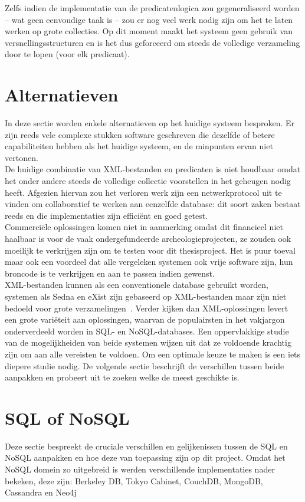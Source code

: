 Zelfs indien de implementatie van de predicatenlogica zou gegeneraliseerd worden -- wat geen eenvoudige taak is -- zou er nog veel werk nodig zijn om het te laten werken op grote collecties. Op dit moment maakt het systeem geen gebruik van versnellingsstructuren en is het dus geforceerd om steeds de volledige verzameling door te lopen (voor elk predicaat).

\section{Alternatieven}
In deze sectie worden enkele alternatieven op het huidige systeem besproken. Er zijn reeds vele complexe stukken software geschreven die dezelfde of betere capabiliteiten hebben als het huidige systeem, en de minpunten ervan niet vertonen.\\

De huidige combinatie van XML-bestanden en predicaten is niet houdbaar omdat het onder andere steeds de volledige collectie voorstellen in het geheugen nodig heeft. Afgezien hiervan zou het verloren werk zijn een netwerkprotocol uit te vinden om collaboratief te werken aan eenzelfde database: dit soort zaken bestaat reeds en die implementaties zijn effici\"ent en goed getest.\\

Commerci\"ele oplossingen komen niet in aanmerking omdat dit financieel niet haalbaar is voor de vaak ondergefundeerde archeologieprojecten, ze zouden ook moeilijk te verkrijgen zijn om te testen voor dit thesisproject. Het is puur toeval maar ook een voordeel dat alle vergeleken systemen ook vrije software zijn, hun broncode is te verkrijgen en aan te passen indien gewenst.\\ 

XML-bestanden kunnen als een conventionele database gebruikt worden, systemen als Sedna en eXist zijn gebaseerd op XML-bestanden maar zijn niet bedoeld voor grote verzamelingen~\cite{Green08}. Verder kijken dan XML-oplossingen levert een grote vari\"eteit aan oplossingen, waarvan de populairsten in het vakjargon onderverdeeld worden in SQL- en NoSQL-databases. Een oppervlakkige studie van de mogelijkheiden van beide systemen wijzen uit dat ze voldoende krachtig zijn om aan alle vereisten te voldoen. Om een optimale keuze te maken is een iets diepere studie nodig. De volgende sectie beschrijft de verschillen tussen beide aanpakken en probeert uit te zoeken welke de meest geschikte is.

\section{SQL of NoSQL}
Deze sectie bespreekt de cruciale verschillen en gelijkenissen tussen de SQL en NoSQL aanpakken en hoe deze van toepassing zijn op dit project. Omdat het NoSQL domein zo uitgebreid is werden verschillende implementaties nader bekeken, deze zijn: Berkeley DB, Tokyo Cabinet, CouchDB, MongoDB, Cassandra en Neo4j

